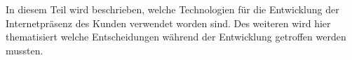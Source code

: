 In diesem Teil wird beschrieben, welche Technologien für die Entwicklung der Internetpräsenz des Kunden verwendet worden sind. Des weiteren wird hier thematisiert welche Entscheidungen während der Entwicklung getroffen werden mussten.